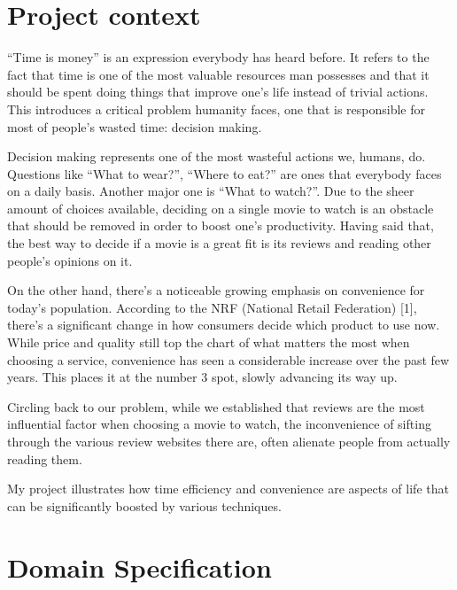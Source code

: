 \documentclass[12pt,a4paper,twoside]{report}
\begin{document}
\section{Project context}

“Time is money” is an expression everybody has heard before. It refers to the
fact that time is one of the most valuable resources man possesses and that it
should be spent doing things that improve one’s life instead of trivial actions.
This introduces a critical problem humanity faces, one that is responsible for
most of people’s wasted time: decision making.

Decision making represents one of the most wasteful actions we, humans, do.
Questions like “What to wear?”, “Where to eat?” are ones that everybody faces
on a daily basis. Another major one is “What to watch?”. Due to the sheer
amount of choices available, deciding on a single movie to watch is an obstacle
that should be removed in order to boost one’s productivity. Having said that,
the best way to decide if a movie is a great fit is its reviews and reading other
people’s opinions on it.

On the other hand, there's a noticeable growing emphasis on convenience for today's population. According to the NRF (National Retail Federation) [1], there's a significant change in how consumers decide which product to use now. While price and quality still top the chart of what matters the most when choosing a service, convenience has seen a considerable increase over the past few years. This places it at the number 3 spot, slowly advancing its way up.

Circling back to our problem, while we established that reviews are the most influential factor when choosing a movie to watch, the inconvenience of sifting through the various review websites there are, often alienate people from actually reading them.

My project illustrates how time efficiency and convenience are aspects of life that can be significantly boosted by various techniques.

\newpage

\section{Domain Specification}
\end{document}
